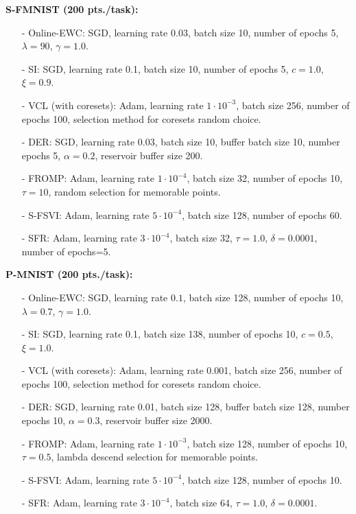 \documentclass{article}
\begin{document}
\textbf{S-FMNIST (200 pts./task):}
\begin{itemize}
	\item[-] Online-EWC: SGD, learning rate $0.03$, batch size  10, number of epochs 5, $\lambda=90$, $\gamma=1.0$.
	\item[-] SI: SGD, learning rate 0.1, batch size 10, number of epochs 5, $c=1.0$, $\xi=0.9$.
	\item[-] VCL (with coresets): Adam, learning rate $1 \cdot 10^{-3}$, batch size 256, number of epochs 100, selection method for coresets random choice.
	\item[-] DER: SGD, learning rate 0.03, batch size 10, buffer batch size 10, number epochs 5, $\alpha =  0.2$, reservoir buffer size 200.
	\item[-] FROMP: Adam, learning rate $1 \cdot 10^{-4}$, batch size 32, number of epochs 10, $\tau = 10$, random selection for memorable points.
	\item[-] S-FSVI: Adam, learning rate $5 \cdot 10^{-4}$, batch size 128, number of epochs 60.
	\item[-] SFR: Adam, learning rate $3 \cdot 10^{-4}$, batch size 32, $\tau=1.0$, $\delta=0.0001$, number of epochs=5.
\end{itemize}


\textbf{P-MNIST (200 pts./task):}
\begin{itemize}
	\item[-] Online-EWC: SGD, learning rate $0.1$, batch size 128, number of epochs 10, $\lambda=0.7$, $\gamma=1.0$.
	\item[-] SI: SGD, learning rate 0.1, batch size 138, number of epochs 10, $c=0.5$, $\xi=1.0$. 
	\item[-] VCL (with coresets): Adam, learning rate 0.001, batch size 256, number of epochs 100, selection method for coresets random choice.
	\item[-] DER:  SGD, learning rate 0.01, batch size 128, buffer batch size 128, number epochs 10, $\alpha=0.3$, reservoir buffer size 2000.
	\item[-] FROMP: Adam, learning rate $1 \cdot 10^{-3}$, batch size 128, number of epochs 10, $\tau = 0.5$, lambda descend selection for memorable points.
	\item[-] S-FSVI: Adam, learning rate $5 \cdot 10^{-4}$, batch size 128, number of epochs 10.
	\item[-] SFR: Adam, learning rate $3 \cdot 10^{-4}$, batch size 64, $\tau=1.0$, $\delta=0.0001$. 
\end{itemize}
\end{document}
